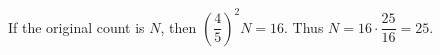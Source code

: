 If the original count is $N$, then $(\dfrac{4}{5})^2N=16$. Thus $N=16\cdot\dfrac{25}{16}=\boxed{25}$.
